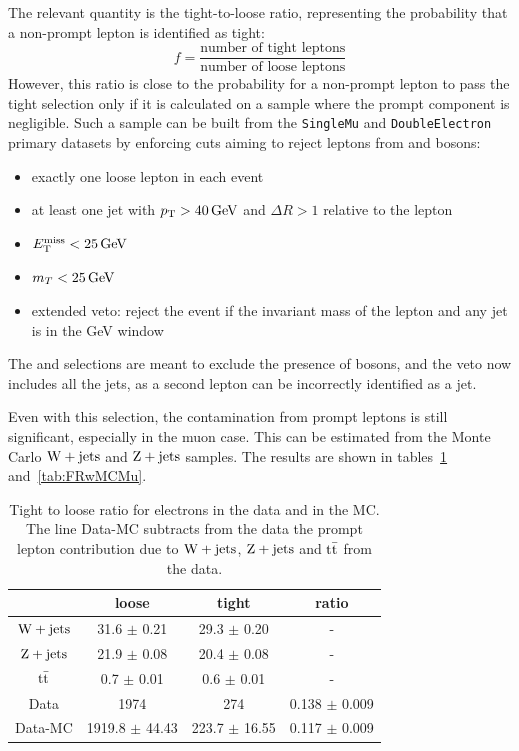 The relevant quantity is the tight-to-loose ratio, representing the
probability that a non-prompt lepton is identified as tight:
\begin{equation*}
    f = \dfrac{\text{number of tight leptons}}{\text{number of loose
    leptons}}
\end{equation*}
However, this ratio is close to the probability for a non-prompt lepton to
pass the tight selection only if it is calculated on a sample where the
prompt component is negligible. Such a sample can be built from the
\texttt{SingleMu} and \texttt{DoubleElectron} primary datasets by enforcing
cuts aiming to reject leptons from \W and \Z bosons:
\begin{itemize}
    \item exactly one loose lepton in each event
    \item at least one jet with $\pt > \unit[40]{GeV}$ and $\Delta R > 1$
        relative to the lepton
    \item $\met < \unit[25]{GeV}$
    \item $\mt < \unit[25]{GeV}$
    \item extended \Z veto: reject the event if the invariant mass of the
        lepton and any jet is in the \unit[76-106]{GeV} window
\end{itemize}
The \met and \mt selections are meant to exclude the presence of \W bosons,
and the \Z veto now includes all the jets, as a second lepton can be incorrectly
identified as a jet.

Even with this selection, the contamination from prompt leptons is still
significant, especially in the muon case. This can be estimated from the Monte Carlo $\mathrm{W} + \text{jets}$ and
$\mathrm{Z} + \text{jets}$ samples. The results are shown in
tables~\ref{tab:FRwMCEl} and~\ref{tab:FRwMCMu}.
\begin{table}[htb]
\begin{center}
\begin{tabular}{*4c}
    \toprule
 & 	 loose & 	 tight & 	 ratio \\
 \midrule
 $\mathrm{W} + \text{jets}$ & 	31.6 $\pm$ 0.21 & 	29.3 $\pm$ 0.20 & 	     -     \\
$\mathrm{Z} + \text{jets}$ & 	21.9 $\pm$ 0.08 & 	20.4 $\pm$ 0.08 & 	     -     \\
$\mathrm{t}\bar{\mathrm{t}}$ & 	 0.7 $\pm$ 0.01 & 	 0.6 $\pm$ 0.01 & 	     -     \\
\midrule
Data & 	 1974 & 	  274 & 	0.138 $\pm$ 0.009 \\
Data-MC &	1919.8 $\pm$ 44.43 & 	223.7 $\pm$ 16.55 & 	0.117 $\pm$ 0.009 \\
\bottomrule
\end{tabular}
\caption{Tight to loose ratio for electrons in the data and in the MC. The line
    Data-MC subtracts from the data the prompt lepton contribution due to
    $\mathrm{W} + \text{jets}$, 
$\mathrm{Z} + \text{jets}$ and $\mathrm{t}\bar{\mathrm{t}}$ from the data.}
\label{tab:FRwMCEl}
\end{center}
\end{table}

